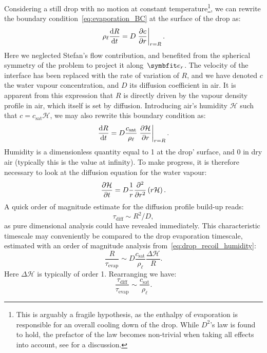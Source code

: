 Considering a still drop with no motion at constant temperature\footnote{This is arguably a fragile hypothesis, as the enthalpy of evaporation is responsible for an overall cooling down of the drop. While $D^2$'s law is found to hold, the prefactor of the law becomes non-trivial when taking all effects into account, see \citet{Cazabat2010} for a discussion.}, we can rewrite the boundary condition~\eqref{eq:evaporation_BC} at the surface of the drop as:
\begin{equation}
\rho_\ell \frac{\mathrm d R}{\mathrm d t} = D \left.\frac{\partial c}{\partial r}\right|_{r=R}.
\label{eq:drop_recoil}
\end{equation}
Here we neglected Stefan's flow contribution, and benefited from the spherical symmetry of the problem to project it along~$\be_r$. The velocity of the interface has been replaced with the rate of variation of $R$, and we have denoted $c$ the water vapour concentration, and $D$ its diffusion coefficient in air. It is apparent from this expression that $R$ is directly driven by the vapour density profile in air, which itself is set by diffusion. 
Introducing air's humidity $\mathcal H$ such that $c = c_\text{sat} \mathcal H$, we may also rewrite this boundary condition as:
\begin{equation}
\frac{\mathrm d R}{\mathrm d t} = D \frac{c_\text{sat}}{\rho_\ell} \left.\frac{\partial \mathcal H}{\partial r}\right|_{r=R}.
\label{eq:drop_recoil_humidity}
\end{equation}
Humidity is a dimensionless quantity equal to 1 at the drop' surface, and 0 in dry air (typically this is the value at infinity).
To make progress, it is therefore necessary to look at the diffusion equation for the water vapour:
\begin{equation}
\frac{\partial \mathcal H}{\partial t} = D\frac{1}{r}\frac{\partial^2}{\partial r^2}\left(r \mathcal H\right).
\label{eq:water_vapour_diffusion}
\end{equation}
A quick order of magnitude estimate for the diffusion profile build-up reads:
$$
\tau_\text{diff} \sim R^2/D,
$$
as pure dimensional analysis could have revealed immediately. This characteristic timescale may conveniently be compared to the drop evaporation timescale, estimated with an order of magnitude analysis from~\eqref{eq:drop_recoil_humidity}:
\begin{equation}
\frac{R}{\tau_\text{evap}} \sim D \frac{c_\text{sat}}{\rho_\ell} \frac{\Delta \mathcal H}{R}.
\label{eq:evaporation_quick_estimate}
\end{equation}
Here $\Delta \mathcal H$ is typically of order 1. Rearranging we have:
$$
\frac{\tau_\text{diff}}{\tau_\text{evap}} \sim\frac{c_\text{sat}}{\rho_\ell}.
$$
